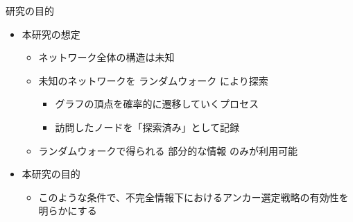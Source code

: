 \documentclass[compress,dvipdfmx,11pt]{beamer}
\begin{document}
\begin{frame}[label={sec:orgb9b5a98}]{研究の目的}
\begin{itemize}
\item 本研究の想定
\begin{itemize}
\item ネットワーク全体の構造は未知
\item 未知のネットワークを \alert{ランダムウォーク} により探索
\begin{itemize}
\item グラフの頂点を確率的に遷移していくプロセス
\item 訪問したノードを「探索済み」として記録
\end{itemize}
\item ランダムウォークで得られる \alert{部分的な情報} のみが利用可能
\end{itemize}
\end{itemize}

\vspace{3mm}

\begin{itemize}
\item 本研究の目的
\begin{itemize}
\item このような条件で、不完全情報下におけるアンカー選定戦略の有効性を明らかにする
\end{itemize}
\end{itemize}
\end{frame}
\end{document}
